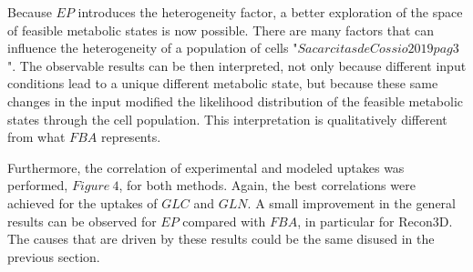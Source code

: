   	Because $EP$ introduces the heterogeneity factor, a better exploration of the space of feasible metabolic states is now possible. There are many factors that can influence the heterogeneity of a population of cells "$Sacar citas de Cossio2019 pag 3$". The observable results can be then interpreted, not only because different input conditions lead to a unique different metabolic state, but because these same changes in the input modified the likelihood distribution of the feasible metabolic states through the cell population. This interpretation is qualitatively different from what $FBA$ represents.
  	
  	Furthermore, the correlation of experimental and modeled uptakes was performed, $Figure\ 4$, for both methods. Again, the best correlations were achieved for the uptakes of $GLC$ and $GLN$. A small improvement in the general results can be observed for $EP$ compared with $FBA$, in particular for Recon3D. The causes that are driven by these results could be the same disused in the previous section. 